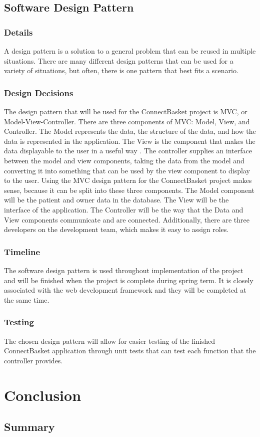 \documentclass[onecolumn, draftclsnofoot,10pt, compsoc]{IEEEtran}
\begin{document}
\subsection{Software Design Pattern}

\subsubsection{Details}
A design pattern is a solution to a general problem that can be reused in multiple situations. There are many different design patterns that can be used for a variety of situations, but often, there is one pattern that best fits a scenario.  


\subsubsection{Design Decisions}
The design pattern that will be used for the ConnectBasket project is MVC, or Model-View-Controller. There are three components of MVC: Model, View, and Controller. The Model represents the data, the structure of the data, and how the data is represented in the application. The View is the component that makes the data displayable to the user in a useful way \cite{mvc}. The controller supplies an interface between the model and view components, taking the data from the model and converting it into something that can be used by the view component to display to the user. Using the MVC design pattern for the ConnectBasket project makes sense, because it can be split into these three components. The Model component will be the patient and owner data in the database. The View will be the interface of the application. The Controller will be the way that the Data and View components communicate and are connected. Additionally, there are three developers on the development team, which makes it easy to assign roles. 


\subsubsection{Timeline}
The software design pattern is used throughout implementation of the project and will be finished when the project is complete during spring term. It is closely associated with the web development framework and they will be completed at the same time.


\subsubsection{Testing}
The chosen design pattern will allow for easier testing of the finished ConnectBasket application through unit tests that can test each function that the controller provides.


\section{Conclusion}

\subsection{Summary}
\end{document}
